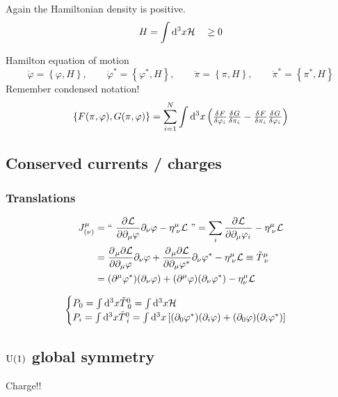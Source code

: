 Again the Hamiltonian density is positive.
\[ H = \int \operatorname{d \!}{^3x}\mathcal{H} \quad \geq 0 \]

\begin{example}
Hamilton equation of motion
\[ \dot{\varphi} = \left\{\varphi,H\right\}, \qquad \dot{\varphi}^* = \left\{\varphi^*,H\right\}, \qquad \dot{\pi} = \left\{\pi,H\right\}, \qquad \dot{\pi}^* = \left\{\pi^*, H\right\} \]
Remember condensed notation!
\[ \left\{F(\pi,\varphi), G(\pi,\varphi)\right\} =\sum^{N}_{i=1} \int \diff{^3x}\left(\fd{F}{\varphi_i}\fd{G}{\pi_i}-\fd{F}{\pi_i}\fd{G}{\varphi_i}\right) \]
\end{example}

\subsection{Conserved currents / charges}
\subsubsection{Translations}
\begin{align*}
J^\mu_{(\nu)} &= \text{`` $ \frac{\partial{^{}}\mathcal{L}}{\partial{{\partial_\mu\varphi}^{}}} \partial_\nu\varphi - \eta^{\mu}_{\;\nu}\mathcal{L}$ ''} = \sum_i  \frac{\partial{^{}}\mathcal{L}}{\partial{{\partial_\mu\varphi_i}^{}}}  - \eta^\mu_{\;\nu}\mathcal{L} \\
&=  \frac{\partial{^{}}_\mu\partial\mathcal{L}}{\partial{{\partial_\mu\varphi}^{}}}  \partial_\nu\varphi +  \frac{\partial{^{}}_\mu\partial\mathcal{L}}{\partial{{\partial_\mu\varphi^*}^{}}}  \partial_\nu\varphi^* - \eta^\mu_{\;\nu}\mathcal{L} \equiv \tilde{T}^\mu_{\;\nu} \\
&= (\partial^\mu\varphi^*)(\partial_\nu\varphi) + (\partial^\mu\varphi)(\partial_\nu\varphi^*) - \eta^\mu_\nu\mathcal{L}
\end{align*}

\[ \begin{cases}
P_0 = \int \operatorname{d \!}{^3x}\tilde{T}^0_{\;0} = \int \operatorname{d \!}{^3x}\mathcal{H} \\
P_i = \int \operatorname{d \!}{^3x}\tilde{T}^0_{\;i} = \int \operatorname{d \!}{^3x}\left[(\partial_0\varphi^*)(\partial_i\varphi)+(\partial_0\varphi)(\partial_i\varphi^*)\right]
\end{cases} \]

\subsection{$\operatorname{U}(1)$ global symmetry}
Charge!!

